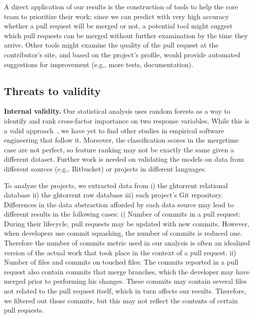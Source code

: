 \documentclass{sig-alternate}
\begin{document}

A direct application of our results is the construction of tools to help the core team to prioritize their work; since we can predict
with very high accuracy whether a pull request will be merged or not, a
potential tool might suggest which pull requests can be merged without further
examination by the time they arrive. Other tools might examine the quality of
the pull request at the contributor's site, and based on the project's
profile, would provide automated suggestions for improvement (e.g., more tests,
documentation). 

\subsection{Threats to validity}

\textbf{Internal validity.} Our statistical analysis uses random forests as a way
to identify and rank cross-factor importance on two response variables. While
this is a valid approach~\cite{Genue10}, we have yet to find other studies in
empirical software engineering that follow it. Moreover, the classification
scores in the \textsf{mergetime} case are not perfect, so feature ranking may
not be exactly the same given a different dataset. Further work is needed on
validating the models on data from different sources (e.g., Bitbucket) or projects in different languages. 

To analyze the projects, we extracted data from i) the {\sc ght}orrent relational
database ii) the {\sc ght}orrent raw database iii) each project's Git repository.
Differences in the data abstraction afforded by each data source may
lead to different results in the following cases: 
i) Number of commits in a pull request: During their lifecycle, pull requests
may be updated with new commits. However, when developers use commit squashing,
the number of commits is reduced one. Therefore the number of commits metric
used in our analysis is often an idealized version of the actual work
that took place in the context of a pull request.
ii) Number of files and commits on touched files: The commits reported
in a pull request also contain commits that merge branches, which the
developer may have merged prior to performing his changes. These commits
may contain several files not related to the pull request itself, which
in turn affects our results. Therefore, we  
filtered out those commits, but this may not reflect the contents of 
certain pull requests.
\end{document}
